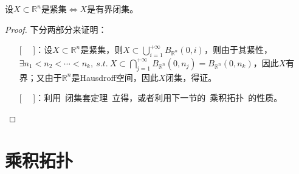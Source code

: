 \documentclass[lang=cn,10pt,device=pad]{elegantbook}
\newcommand{\cusong}{\CJKfamily{cusong}}%
\newcommand{\lei}[1]{~\textcolor{myblu}{\cusong{#1}}~}
\newcommand{\lanse}[1]{~\textcolor{myblu}{#1}~}
\newcommand{\st}{~s.t.~}
\newcommand{\dabing}{\displaystyle\bigcup}
\newcommand{\dajiao}{\displaystyle\bigcap}
\begin{document}
\begin{theorem}\label{c3-t2}
	设$X\subset \mathbb{R}^{n}$是紧集$\iff X$是有界闭集。
\end{theorem}
\begin{proof}
下分两部分来证明：
	\begin{enumerate}
		\item[[\lei{$\Rightarrow $}]]：设$X\subset \mathbb{R}^{n}$是紧集，则$X\subset \dabing_{i=1}^{+\infty}B_{\mathbb{R}^{n}}(0,i)$，则由于其紧性，$\exists n_{1}<n_{2}<\cdots<n_{k} , \st X\subset \dajiao_{j=1}^{+\infty}B_{\mathbb{R}^{n}}(0,n_{j}) = B_{\mathbb{R}^{n}}(0,n_{k})$，因此$X$有界；又由于$\mathbb{R}^{n}$是Hausdroff空间，因此$X$闭集，得证。
		\item[[\lei{$\Leftarrow $}]]：利用\lanse{闭集套定理}立得，或者利用下一节的\lanse{乘积拓扑}的性质。
	\end{enumerate}
\end{proof}
\section{乘积拓扑}
\end{document}
